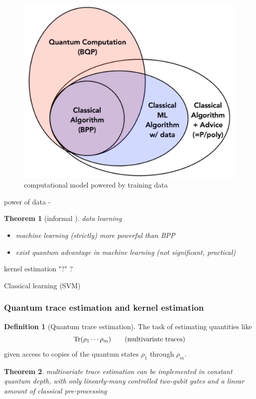 \documentclass[
10pt,
aps,
pra,
linenumbers,
floatfix,
]{revtex4-2}
\theoremstyle{plain}
\newtheorem{theorem}{Theorem}
\theoremstyle{definition}
\newtheorem{definition}{Definition}
\begin{document}
\begin{figure}[!ht]
	\centering
	\includegraphics[width=.35\linewidth]{data.jpg}
	\caption{computational model powered by training data}
\end{figure}
power of data - 
\begin{theorem}[informal \cite{huangPowerDataQuantum2021}]
	data learning
	\begin{itemize}
		\item machine learning (strictly) more powerful than BPP
		\item exist quantum advantage in machine learning (not significant, practical)
	\end{itemize}
\end{theorem}
\begin{algorithm}[H]
    \DontPrintSemicolon
    \BlankLine
     {
        kernel estimation 
    {\Return "?"}
    }
    \Return ?
    \caption{Classical learning (SVM)}
    \label{alg:classical_learning}
\end{algorithm}

\subsubsection{Quantum trace estimation and kernel estimation}
\begin{definition}[Quantum trace estimation]
	The task of estimating quantities like 
	\begin{equation}
		\Tr(\rho_1 \cdots \rho_m)
		\tag{multivariate traces}
	\end{equation}
	given access to copies of the quantum states $\rho_1$  through $\rho_m$.
\end{definition}
\begin{theorem}
	\cite{quekMultivariateTraceEstimation2022}
	multivariate trace estimation can be implemented in constant quantum depth, with only linearly-many controlled two-qubit gates and a linear amount of classical pre-processing	
\end{theorem}
\end{document}
